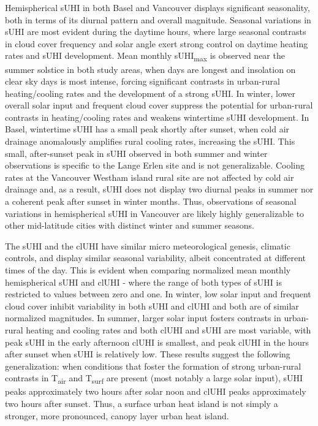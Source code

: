 \begin{bibunit}
Hemispherical sUHI in both Basel and Vancouver displays significant seasonality, both in terms of its diurnal pattern and overall magnitude. Seasonal variations in sUHI are most evident during the daytime hours, where large seasonal contrasts in cloud cover frequency and solar angle exert strong control on daytime heating rates and sUHI development. Mean monthly sUHI\textsubscript{max} is observed near the summer solstice in both study areas, when days are longest and insolation on clear sky days is most intense, forcing significant contrasts in urban-rural heating/cooling rates and the development of a strong sUHI. In winter, lower overall solar input and frequent cloud cover suppress the potential for urban-rural contrasts in heating/cooling rates and weakens wintertime sUHI development. In Basel, wintertime sUHI has a small peak shortly after sunset, when cold air drainage anomalously amplifies rural cooling rates, increasing the sUHI. This small, after-sunset peak in sUHI observed in both summer and winter observations is specific to the Lange Erlen site and is not generalizable. Cooling rates at the Vancouver Westham island rural site are not affected by cold air drainage and, as a result, sUHI does not display two diurnal peaks in summer nor a coherent peak after sunset in winter months. Thus, observations of seasonal variations in hemispherical sUHI in Vancouver are likely highly generalizable to other mid-latitude cities with distinct winter and summer seasons. 

The sUHI and the clUHI have similar micro meteorological genesis, climatic controls, and display similar seasonal variability, albeit concentrated at different times of the day. This is evident when comparing normalized mean monthly hemispherical sUHI and clUHI - where the range of both types of sUHI is restricted to values between zero and one. In winter, low solar input and frequent cloud cover inhibit variability in both sUHI and clUHI and both are of similar normalized magnitudes. In summer, larger solar input fosters contrasts in urban-rural heating and cooling rates and both clUHI and sUHI are most variable, with peak sUHI in the early afternoon clUHI is smallest, and peak clUHI in the hours after sunset when sUHI is relatively low. These results suggest the following generalization: when conditions that foster the formation of strong urban-rural contrasts in T\textsubscript{air} and T\textsubscript{surf} are present (most notably a large solar input), sUHI peaks approximately two hours after solar noon and clUHI peaks approximately two hours after sunset. Thus, a surface urban heat island is not simply a stronger, more pronounced, canopy layer urban heat island. 


\end{bibunit}
